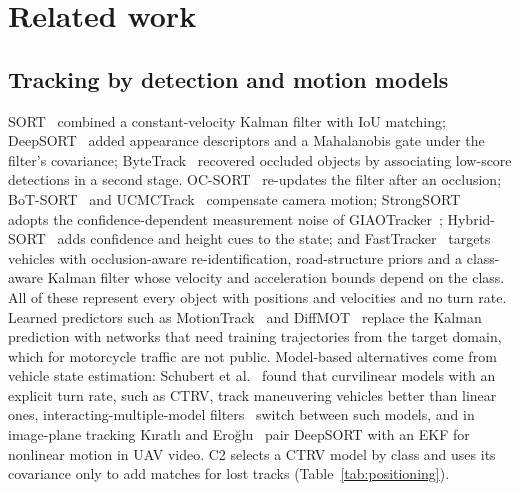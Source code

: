 \documentclass[twocolumn]{svjour3}
\begin{document}
\section{Related work}\label{sec:related}

\subsection{Tracking by detection and motion models}\label{subsec:rw_mot}

SORT~\cite{Bewley2016_sort} combined a constant-velocity Kalman filter with IoU
matching; DeepSORT~\cite{Wojke2017_deepsort} added appearance descriptors and a
Mahalanobis gate under the filter's covariance; ByteTrack~\cite{Zhang2022_bytetrack}
recovered occluded objects by associating low-score detections in a second
stage. OC-SORT~\cite{Cao2023_ocsort} re-updates the filter after an occlusion;
BoT-SORT~\cite{Aharon2022_botsort} and UCMCTrack~\cite{Yi2024_ucmctrack}
compensate camera motion; StrongSORT~\cite{Du2023_strongsort} adopts the
confidence-dependent measurement noise of GIAOTracker~\cite{Du2021_giaotracker};
Hybrid-SORT~\cite{Yang2024_hybridsort} adds confidence and height cues to the
state; and FastTracker~\cite{Hashempoor2025_fasttracker} targets vehicles with
occlusion-aware re-identification, road-structure priors and a class-aware
Kalman filter whose velocity and acceleration bounds depend on the class. All of
these represent every object with positions and velocities and no turn rate.
Learned predictors such as MotionTrack~\cite{Qin2023_motiontrack} and
DiffMOT~\cite{Lv2024_diffmot} replace the Kalman prediction with networks that
need training trajectories from the target domain, which for motorcycle traffic
are not public. Model-based alternatives come from vehicle state estimation:
Schubert et al.~\cite{Schubert2008_ctrv} found that curvilinear models with an
explicit turn rate, such as CTRV, track maneuvering vehicles better than linear
ones, interacting-multiple-model filters~\cite{Blom1988_imm,BarShalom2001_estimation}
switch between such models, and in image-plane tracking K{\i}ratl{\i} and
Ero{\u{g}}lu~\cite{Kiratli2025_yolo11efac} pair DeepSORT with an EKF for nonlinear
motion in UAV video. C2 selects a CTRV model by class and uses its
covariance only to add matches for lost tracks (Table~\ref{tab:positioning}).
\end{document}
